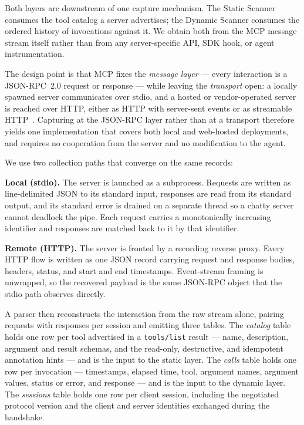 \documentclass[sigconf]{acmart}
\begin{document}
Both layers are downstream of one capture mechanism. The Static Scanner
consumes the tool catalog a server advertises; the Dynamic Scanner consumes the
ordered history of invocations against it. We obtain both from the MCP message
stream itself rather than from any server-specific API, SDK hook, or agent
instrumentation.

The design point is that MCP fixes the \emph{message layer} --- every
interaction is a JSON-RPC~2.0 request or response --- while leaving the
\emph{transport} open: a locally spawned server communicates over stdio, and a
hosted or vendor-operated server is reached over HTTP, either as HTTP with
server-sent events or as streamable HTTP~\cite{mcp2026spec}. Capturing at the
JSON-RPC layer rather than at a transport therefore yields one implementation
that covers both local and web-hosted deployments, and requires no cooperation
from the server and no modification to the agent.

We use two collection paths that converge on the same records:

\textbf{Local (stdio).} The server is launched as a subprocess. Requests are
written as line-delimited JSON to its standard input, responses are read from
its standard output, and its standard error is drained on a separate thread so
a chatty server cannot deadlock the pipe. Each request carries a monotonically
increasing identifier and responses are matched back to it by that identifier.

\textbf{Remote (HTTP).} The server is fronted by a recording reverse proxy.
Every HTTP flow is written as one JSON record carrying request and response
bodies, headers, status, and start and end timestamps. Event-stream framing is
unwrapped, so the recovered payload is the same JSON-RPC object that the stdio
path observes directly.

A parser then reconstructs the interaction from the raw stream alone, pairing
requests with responses per session and emitting three tables. The
\emph{catalog} table holds one row per tool advertised in a \texttt{tools/list}
result --- name, description, argument and result schemas, and the
read-only, destructive, and idempotent annotation hints --- and is the input to
the static layer. The \emph{calls} table holds one row per invocation ---
timestamps, elapsed time, tool, argument names, argument values, status or
error, and response --- and is the input to the dynamic layer. The
\emph{sessions} table holds one row per client session, including the
negotiated protocol version and the client and server identities exchanged
during the handshake.
\end{document}
